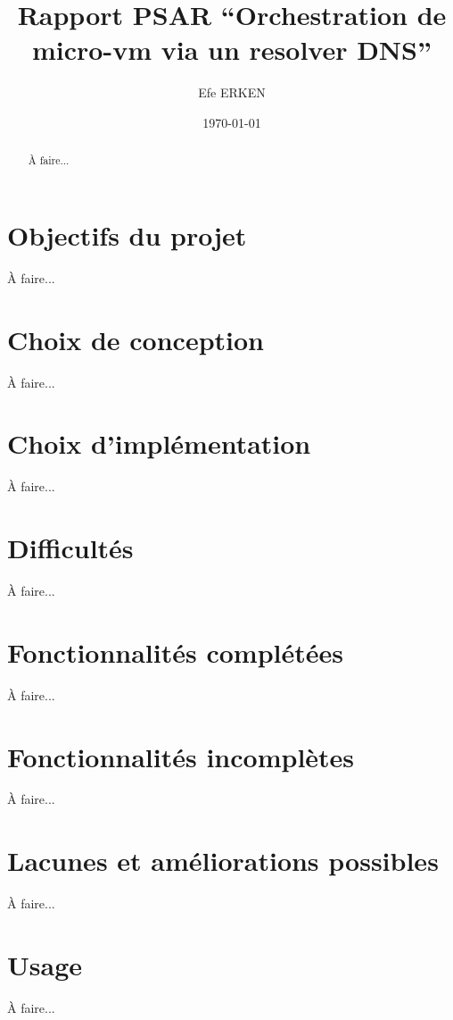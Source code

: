 \documentclass[12pt]{article}
\author{Efe ERKEN}
\date{\today}
\title{Rapport PSAR ``Orchestration de micro-vm via un resolver DNS''}
\begin{document}
\maketitle

\begin{abstract}
    À faire...
\end{abstract}

\section{Objectifs du projet}
    À faire...

\section{Choix de conception}
    À faire...

\section{Choix d'implémentation}
    À faire...

\section{Difficultés}
    À faire...

\section{Fonctionnalités complétées}
    À faire...

\section{Fonctionnalités incomplètes}
    À faire...

\section{Lacunes et améliorations possibles}
    À faire...

\section{Usage}
    À faire...
\end{document}
